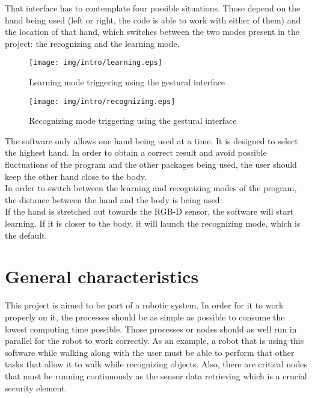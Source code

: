 That interface has to contemplate four possible situations. Those depend on the hand being used (left or right, the code is able to work with either of them) and the location of that hand, which switches between the two modes present in the project: the recognizing and the learning mode. 

\begin{wrapfigure}{l}{0.5\textwidth}
	\centering
    \texttt{[image: img/intro/learning.eps]}
	\caption[Learning Mode Triggering]{Learning mode triggering using the gestural interface}
\end{wrapfigure}


\begin{wrapfigure}{r}{0.5\textwidth}
	\centering
    \texttt{[image: img/intro/recognizing.eps]}
	\caption[Recognizing Mode Triggering]{Recognizing mode triggering using the gestural interface}
\end{wrapfigure}

The software only allows one hand being used at a time. It is designed to select the highest hand. In order to obtain a correct result and avoid possible fluctuations of the program and the other packages being used, the user should keep the other hand close to the body. 
\\


In order to switch between the learning and recognizing modes of the program, the distance between the hand and the body
is being used: 
\\

If the hand is stretched out towards the RGB-D sensor, the software will start learning. If it is closer to the body, 
it will launch the recognizing mode, which is the default. 







\section*{General characteristics}
This project is aimed to be part of a robotic system. In order for it to work properly on it, the processes should be as simple as possible to consume the lowest computing time possible. Those processes or nodes should as well run in parallel for the robot to work correctly. As an example, a robot that is using this software while walking along with the user must be able to perform that other tasks that allow it to walk while recognizing objects. Also, there are critical nodes that must be running continuously as the sensor data retrieving which is a crucial security element. 
\\

